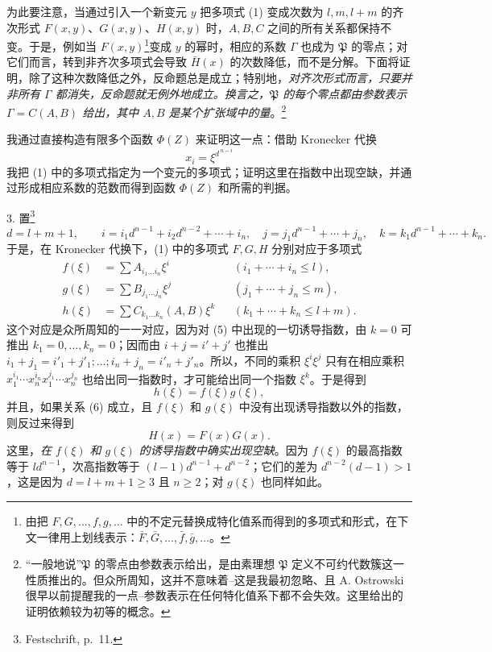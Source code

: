 为此要注意，当通过引入一个新变元 $y$ 把多项式 (1) 变成次数为 $l,m,l+m$ 的齐次形式 $F(x,y)$、$G(x,y)$、$H(x,y)$ 时，$A,B,C$ 之间的所有关系都保持不变。于是，例如当 $F(x,y)$\footnote{由把 $F,G,\ldots,f,g,\ldots$ 中的不定元替换成特化值系而得到的多项式和形式，在下文一律用上划线表示：$\bar F,\bar G,\ldots,\bar f,\bar g,\ldots$。}变成 $y$ 的幂时，相应的系数 $\Gamma$ 也成为 $\mathfrak P$ 的零点；对它们而言，转到非齐次多项式会导致 $\bar H(x)$ 的次数降低，而不是分解。下面将证明，除了这种次数降低之外，反命题总是成立；特别地，\emph{对齐次形式而言，只要并非所有 $\Gamma$ 都消失，反命题就无例外地成立。换言之，$\mathfrak P$ 的每个零点都由参数表示 $\Gamma=C(A,B)$ 给出，其中 $A,B$ 是某个扩张域中的量}。\footnote{“一般地说”$\mathfrak P$ 的零点由参数表示给出，是由素理想 $\mathfrak P$ 定义不可约代数簇这一性质推出的。但众所周知，这并不意味着--这是我最初忽略、且 A. Ostrowski 很早以前提醒我的一点--参数表示在任何特化值系下都不会失效。这里给出的证明依赖较为初等的概念。}

我通过直接构造有限多个函数 $\Phi(Z)$ 来证明这一点：借助 Kronecker 代换
\[
 x_i=\xi^{d^{\,n-i}}
\]
我把 (1) 中的多项式指定为\emph{一}个变元的多项式；证明这里在指数中出现空缺，并通过形成相应系数的范数而得到函数 $\Phi(Z)$ 和所需的判据。

3. 置\footnote{Festschrift, p.~11.}
\begin{equation}
 d=l+m+1,\qquad
 i=i_1d^{n-1}+i_2d^{n-2}+\cdots+i_n,
\quad
 j=j_1d^{n-1}+\cdots+j_n,
\quad
 k=k_1d^{n-1}+\cdots+k_n.
\tag{4}
\end{equation}
于是，在 Kronecker 代换下，(1) 中的多项式 $F,G,H$ 分别对应于多项式
\begin{equation}
\begin{aligned}
 f(\xi)&=\sum A_{i_1\ldots i_n}\xi^i &&(i_1+\cdots+i_n\le l),\\
 g(\xi)&=\sum B_{j_1\ldots j_n}\xi^j &&(j_1+\cdots+j_n\le m),\\
 h(\xi)&=\sum C_{k_1\ldots k_n}(A,B)\xi^k &&(k_1+\cdots+k_n\le l+m).
\end{aligned}
\tag{5}
\end{equation}
这个对应是众所周知的一一对应，因为对 (5) 中出现的一切诱导指数，由 $k=0$ 可推出 $k_1=0,\ldots,k_n=0$；因而由 $i+j=i'+j'$ 也推出 $i_1+j_1=i'_1+j'_1;\ldots;i_n+j_n=i'_n+j'_n$。所以，不同的乘积 $\xi^i\xi^j$ 只有在相应乘积 $x_1^{i_1}\cdots x_n^{i_n}x_1^{j_1}\cdots x_n^{j_n}$ 也给出同一指数时，才可能给出同一个指数 $\xi^k$。于是得到
\begin{equation}
 h(\xi)=f(\xi)g(\xi),
\tag{6}
\end{equation}
并且，如果关系 (6) 成立，且 $f(\xi)$ 和 $g(\xi)$ 中没有出现诱导指数以外的指数，则反过来得到
\begin{equation}
 H(x)=F(x)G(x).
\tag{7}
\end{equation}
这里，\emph{在 $f(\xi)$ 和 $g(\xi)$ 的诱导指数中确实出现空缺}。因为 $f(\xi)$ 的最高指数等于 $ld^{n-1}$，次高指数等于 $(l-1)d^{n-1}+d^{n-2}$；它们的差为 $d^{n-2}(d-1)>1$，这是因为 $d=l+m+1\ge3$ 且 $n\ge2$；对 $g(\xi)$ 也同样如此。

